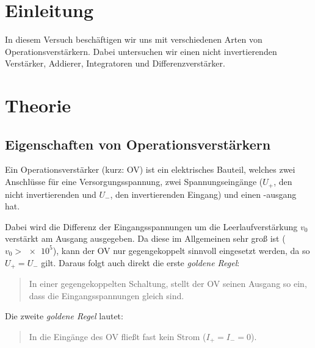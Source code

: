 \FloatBarrier
\section{Einleitung}

In diesem Versuch beschäftigen wir uns mit verschiedenen Arten von
Operationsverstärkern. Dabei untersuchen wir einen nicht invertierenden
Verstärker, Addierer, Integratoren und Differenzverstärker.


\FloatBarrier
\section{Theorie}

\subsection{Eigenschaften von Operationsverstärkern}

Ein Operationsverstärker (kurz: OV) ist ein elektrisches Bauteil, welches zwei
Anschlüsse für eine Versorgungsspannung, zwei Spannungseingänge ($U_+$, den
nicht invertierenden und $U_-$, den invertierenden Eingang) und einen
-ausgang hat.

Dabei wird die Differenz der Eingangsspannungen um die Leerlaufverstärkung
$v_0$ verstärkt am Ausgang ausgegeben. Da diese im Allgemeinen sehr groß ist
($v_0 > \num{e5}$), kann der OV nur gegengekoppelt sinnvoll eingesetzt werden,
da so $U_+ = U_-$ gilt. Daraus folgt auch direkt die erste \emph{goldene
Regel}:
\begin{quote}
    In einer gegengekoppelten Schaltung, stellt der OV seinen Ausgang so ein,
    dass die Eingangsspannungen gleich sind.
\end{quote}
Die zweite \emph{goldene Regel} lautet:
\begin{quote}
    In die Eingänge des OV fließt fast kein Strom ($I_+ = I_- = 0$).
\end{quote}

